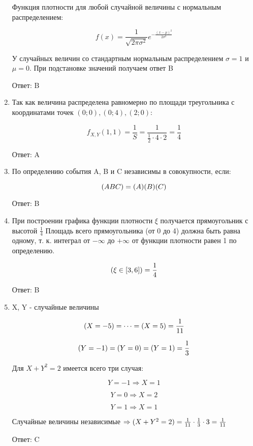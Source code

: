 \documentclass[a4paper]{article} %
\let\P\relax
\DeclareMathOperator{\P}{\mathbb{P}}
\begin{document}
\begin{enumerate}
    Функция плотности для любой случайной величины с нормальным распределением:
    
    \[ f(x)=\frac{1}{\sqrt{2\pi\sigma^2}} e^{-\frac{(x-\mu)^2}{2\sigma^2}} \]
    
    У случайных величин со стандартным нормальным распределением $\sigma=1$ и $\mu=0$. При подстановке значений получаем ответ B

    Ответ: B

    \item

    Так как величина распределена равномерно по площади треугольника с координатами точек $(0;0), (0;4), (2;0)$:

    \[f_{X,Y}(1,1) = \frac{1}{S} = \frac{1}{\frac{1}{2}\cdot 4\cdot 2} = \frac{1}{4}\]

    Ответ: A

    \item
    
    По определению события A, B и C независимы в совокупности, если:
    
    \[ \P(ABC) = \P(A)\P(B)\P(C) \]

    Ответ: B

    \item

    При построении графика функции плотности $\xi$ получается прямоугольник с высотой $\frac{1}{4}$
    Площадь всего прямоугольника (от 0 до 4) должна быть равна одному, т. к. интеграл от $-\infty$ до $+\infty$ от функции плотности равен 1 по определению.
    
    \[\P({\xi\in[3,6]}) = \frac{1}{4}\]

    Ответ: B

    \item

    X, Y - случайные величины

    \[\P(X=-5) = \dots = \P(X=5) = \frac{1}{11}\]

    \[\P(Y=-1) = \P(Y=0) = \P(Y=1) = \frac{1}{3}\]

    Для $X + Y^2 = 2$ имеется всего три случая:

    \[Y = -1 \Rightarrow X = 1\]

    \[Y = 0 \Rightarrow X = 2\]

    \[Y = 1 \Rightarrow X = 1\]

    Случайные величины независимые $\Rightarrow \P(X + Y^2 = 2) = \frac{1}{11} \cdot\frac{1}{3} \cdot 3 = \frac{1}{11}$

    Ответ: C


\end{enumerate}
\end{document}
